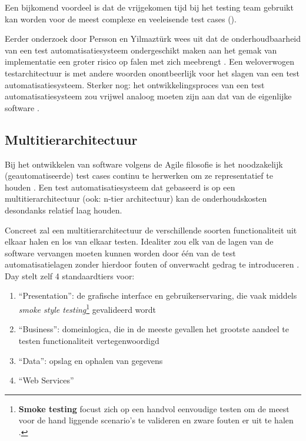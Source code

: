 Een bijkomend voordeel is dat de vrijgekomen tijd bij het testing team gebruikt kan worden voor de meest complexe en veeleisende test cases (\cite{Barrett2013}).

Eerder onderzoek door Persson en Yilmaztürk wees uit dat de onderhoudbaarheid van een test automatisatiesysteem ondergeschikt maken aan het gemak van implementatie een groter risico op falen met zich meebrengt \autocite{Persson2004}. Een weloverwogen testarchitectuur is met andere woorden onontbeerlijk voor het slagen van een test automatisatiesysteem. Sterker nog: het ontwikkelingsproces van een test automatisatiesysteem zou vrijwel analoog moeten zijn aan dat van de eigenlijke software \autocite{Pettichord1996}.

\subsection{Multitierarchitectuur}

Bij het ontwikkelen van software volgens de Agile filosofie is het noodzakelijk (geautomatiseerde) test cases continu te herwerken om ze representatief te houden \autocite{Day2014}. Een test automatisatiesysteem dat gebaseerd is op een multitierarchitectuur (ook: n-tier architectuur) kan de onderhoudskosten desondanks relatief laag houden.

Concreet zal een multitierarchitectuur de verschillende soorten functionaliteit uit elkaar halen en los van elkaar testen. Idealiter zou elk van de lagen van de software vervangen moeten kunnen worden door één van de test automatisatielagen zonder hierdoor fouten of onverwacht gedrag te introduceren \autocite{Anandan}. Day stelt zelf 4 standaardtiers voor:

\begin{enumerate}
    \item ``Presentation'': de grafische interface en gebruikerservaring, die vaak middels \emph{smoke style testing}\footnote{\textbf{Smoke testing} focust zich op een handvol eenvoudige testen om de meest voor de hand liggende scenario's te valideren en zware fouten er uit te halen \autocite{Klostermann2019}.} gevalideerd wordt
    \item ``Business'': domeinlogica, die in de meeste gevallen het grootste aandeel te testen functionaliteit vertegenwoordigd
    \item ``Data'': opslag en ophalen van gegevens
    \item ``Web Services''
\end{enumerate}

